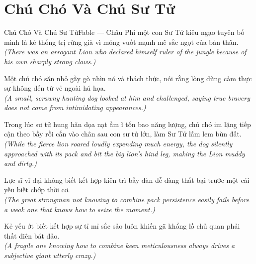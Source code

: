 \section{Chú Chó Và Chú Sư Tử}
\begin{truyen}{Chú Chó Và Chú Sư Tử}{Fable --- Châu Phi}
 một con Sư Tử kiêu ngạo tuyên bố mình là kẻ thống trị rừng già vì móng vuốt mạnh mẽ sắc ngọt của bản thân.\\[4pt]
\textit{(There was an arrogant Lion who declared himself ruler of the jungle because of his own sharply strong claws.)}

Một chú chó săn nhỏ gầy gò nhìn nó và thách thức, nói rằng lòng dũng cảm thực sự không đến từ vẻ ngoài hú họa.\\[4pt]
\textit{(A small, scrawny hunting dog looked at him and challenged, saying true bravery does not come from intimidating appearances.)}

Trong lúc sư tử hung hãn dọa nạt ầm ĩ tốn bao năng lượng, chú chó im lặng tiếp cận theo bầy rồi cắn vào chân sau con sư tử lớn, làm Sư Tử lấm lem bùn đất.\\[4pt]
\textit{(While the fierce lion roared loudly expending much energy, the dog silently approached with its pack and bit the big lion's hind leg, making the Lion muddy and dirty.)}

Lực sĩ vĩ đại không biết kết hợp kiên trì bầy đàn dễ dàng thất bại trước một cái yếu biết chớp thời cơ.\\[4pt]
\textit{(The great strongman not knowing to combine pack persistence easily fails before a weak one that knows how to seize the moment.)}

\end{truyen}
\begin{baihoc}
  Kẻ yếu ớt biết kết hợp sự tỉ mỉ sắc sảo luôn khiến gã khổng lồ chủ quan phải thất điên bát đảo.\\[4pt]
  \textit{(A fragile one knowing how to combine keen meticulousness always drives a subjective giant utterly crazy.)}
\end{baihoc}

